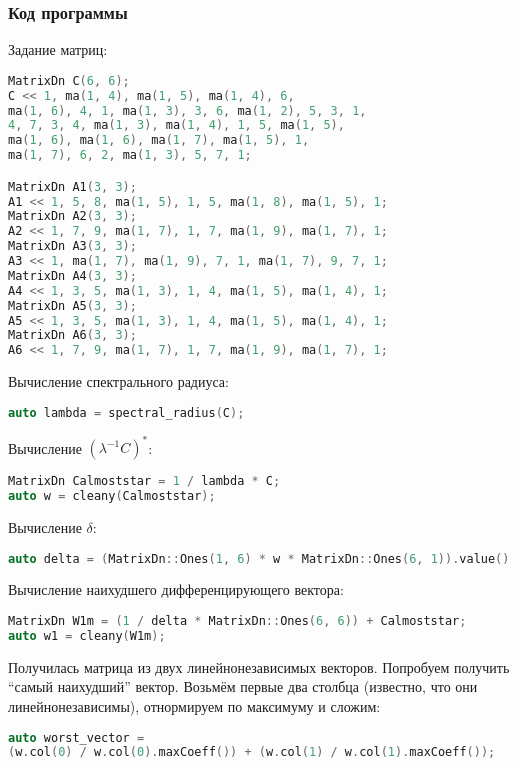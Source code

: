 \documentclass[specialist,
  substylefile = spbu.rtx,
  href,
  colorlinks=true,
  12pt]{disser}
\begin{document}
\subsubsection{Код программы}

Задание матриц:
\begin{lstlisting}[language=c++,basicstyle=\small\ttfamily,keywordstyle=\color{red}]
MatrixDn C(6, 6);
C << 1, ma(1, 4), ma(1, 5), ma(1, 4), 6,
ma(1, 6), 4, 1, ma(1, 3), 3, 6, ma(1, 2), 5, 3, 1,
4, 7, 3, 4, ma(1, 3), ma(1, 4), 1, 5, ma(1, 5),
ma(1, 6), ma(1, 6), ma(1, 7), ma(1, 5), 1,
ma(1, 7), 6, 2, ma(1, 3), 5, 7, 1;

MatrixDn A1(3, 3);
A1 << 1, 5, 8, ma(1, 5), 1, 5, ma(1, 8), ma(1, 5), 1;
MatrixDn A2(3, 3);
A2 << 1, 7, 9, ma(1, 7), 1, 7, ma(1, 9), ma(1, 7), 1;
MatrixDn A3(3, 3);
A3 << 1, ma(1, 7), ma(1, 9), 7, 1, ma(1, 7), 9, 7, 1;
MatrixDn A4(3, 3);
A4 << 1, 3, 5, ma(1, 3), 1, 4, ma(1, 5), ma(1, 4), 1;
MatrixDn A5(3, 3);
A5 << 1, 3, 5, ma(1, 3), 1, 4, ma(1, 5), ma(1, 4), 1;
MatrixDn A6(3, 3);
A6 << 1, 7, 9, ma(1, 7), 1, 7, ma(1, 9), ma(1, 7), 1;
\end{lstlisting}

Вычисление спектрального радиуса:
\begin{lstlisting}[language=c++,basicstyle=\footnotesize\ttfamily]
auto lambda = spectral_radius(C);
\end{lstlisting}

Вычисление $(\lambda^{-1}C)^*$:
\begin{lstlisting}[language=c++,basicstyle=\footnotesize\ttfamily]
MatrixDn Calmoststar = 1 / lambda * C;
auto w = cleany(Calmoststar);
\end{lstlisting}


Вычисление $\delta$:
\begin{lstlisting}[language=c++,basicstyle=\footnotesize\ttfamily]
auto delta = (MatrixDn::Ones(1, 6) * w * MatrixDn::Ones(6, 1)).value();
\end{lstlisting}

Вычисление наихудшего дифференцирующего вектора:
\begin{lstlisting}[language=c++,basicstyle=\footnotesize\ttfamily]
MatrixDn W1m = (1 / delta * MatrixDn::Ones(6, 6)) + Calmoststar;
auto w1 = cleany(W1m);
\end{lstlisting}

Получилась матрица из двух линейнонезависимых векторов. Попробуем получить \enquote{самый наихудший} вектор. Возьмём первые два столбца (известно, что они линейнонезависимы), отнормируем по максимуму и сложим:
\begin{lstlisting}[language=c++,basicstyle=\footnotesize\ttfamily]
auto worst_vector =
(w.col(0) / w.col(0).maxCoeff()) + (w.col(1) / w.col(1).maxCoeff());
\end{lstlisting}
\end{document}
